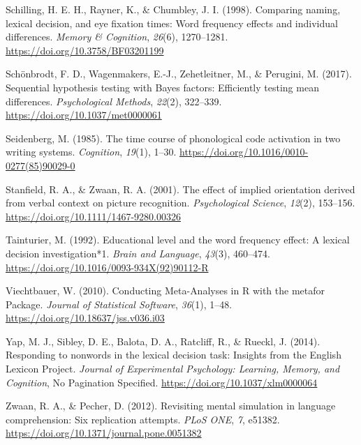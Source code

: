 \documentclass[
  man]{apa6}
\newlength{\cslhangindent}
\newlength{\cslentryspacingunit} %
\newenvironment{CSLReferences}[2] %
 {%
  \setlength{\parindent}{0pt}
  \ifodd #1
  \let\oldpar\par
  \def\par{\hangindent=\cslhangindent\oldpar}
  \fi
  \setlength{\parskip}{#2\cslentryspacingunit}
 }%
 {}
\begin{document}
\begin{CSLReferences}{1}{0}
\leavevmode{}%
Schilling, H. E. H., Rayner, K., \& Chumbley, J. I. (1998). Comparing naming, lexical decision, and eye fixation times: {Word} frequency effects and individual differences. \emph{Memory \& Cognition}, \emph{26}(6), 1270--1281. \url{https://doi.org/10.3758/BF03201199}

\leavevmode{}%
Schönbrodt, F. D., Wagenmakers, E.-J., Zehetleitner, M., \& Perugini, M. (2017). Sequential hypothesis testing with {Bayes} factors: {Efficiently} testing mean differences. \emph{Psychological Methods}, \emph{22}(2), 322--339. \url{https://doi.org/10.1037/met0000061}

\leavevmode{}%
Seidenberg, M. (1985). The time course of phonological code activation in two writing systems. \emph{Cognition}, \emph{19}(1), 1--30. \url{https://doi.org/10.1016/0010-0277(85)90029-0}

\leavevmode{}%
Stanfield, R. A., \& Zwaan, R. A. (2001). The effect of implied orientation derived from verbal context on picture recognition. \emph{Psychological Science}, \emph{12}(2), 153--156. \url{https://doi.org/10.1111/1467-9280.00326}

\leavevmode{}%
Tainturier, M. (1992). Educational level and the word frequency effect: {A} lexical decision investigation*1. \emph{Brain and Language}, \emph{43}(3), 460--474. \url{https://doi.org/10.1016/0093-934X(92)90112-R}

\leavevmode{}%
Viechtbauer, W. (2010). Conducting {Meta}-{Analyses} in {R} with the metafor {Package}. \emph{Journal of Statistical Software}, \emph{36}(1), 1--48. \url{https://doi.org/10.18637/jss.v036.i03}

\leavevmode{}%
Yap, M. J., Sibley, D. E., Balota, D. A., Ratcliff, R., \& Rueckl, J. (2014). Responding to nonwords in the lexical decision task: Insights from the {English Lexicon Project}. \emph{Journal of Experimental Psychology: Learning, Memory, and Cognition}, No Pagination Specified. \url{https://doi.org/10.1037/xlm0000064}

\leavevmode{}%
Zwaan, R. A., \& Pecher, D. (2012). Revisiting mental simulation in language comprehension: Six replication attempts. \emph{PLoS ONE}, \emph{7}, e51382. \url{https://doi.org/10.1371/journal.pone.0051382}

\end{CSLReferences}

\endgroup
\end{document}
